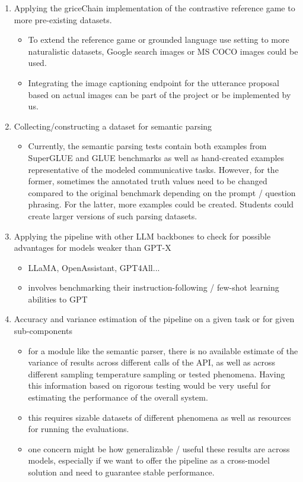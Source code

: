 \documentclass[fleqn,reqno,10pt]{article}
\begin{document}
\begin{enumerate}
  \item Applying the griceChain implementation of the contrastive reference game to more pre-existing datasets.
  \begin{itemize}
    \item To extend the reference game or grounded language use setting to more naturalistic datasets, Google search images or MS COCO images could be used.
    \item Integrating the image captioning endpoint for the utterance proposal based on actual images can be part of the project or be implemented by us.
  \end{itemize}
  \item Collecting/constructing a dataset for semantic parsing
  \begin{itemize}
    \item Currently, the semantic parsing tests contain both examples from SuperGLUE and GLUE benchmarks as well as hand-created examples representative of the modeled communicative tasks. However, for the former, sometimes the annotated truth values need to be changed compared to the original benchmark depending on the prompt / question phrasing. For the latter, more examples could be created. Students could create larger versions of such parsing datasets.
  \end{itemize}
  \item Applying the pipeline with other LLM backbones to check for possible advantages for models weaker than GPT-X
  \begin{itemize}
    \item LLaMA, OpenAssistant, GPT4All...
    \item involves benchmarking their instruction-following / few-shot learning abilities to GPT
  \end{itemize}
  \item Accuracy and variance estimation of the pipeline on a given task or for given sub-components
  \begin{itemize}
    \item for a module like the semantic parser, there is no available estimate of the variance of results across different calls of the API, as well as across different sampling temperature sampling or tested phenomena. Having this information based on rigorous testing would be very useful for estimating the performance of the overall system.
    \item this requires sizable datasets of different phenomena as well as resources for running the evaluations.
    \item one concern might be how generalizable / useful these results are across models, especially if we want to offer the pipeline as a cross-model solution and need to guarantee stable performance.
  \end{itemize}
\end{enumerate}
\end{document}
